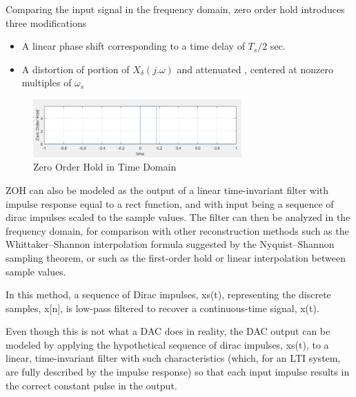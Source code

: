 \documentclass{article}
\begin{document}
Comparing the input signal in the frequency domain, zero order hold introduces three modifications
\begin{itemize}
    \item A linear phase shift corresponding to a time delay of $ T_s / 2 $ sec. 
    
    \item 
    A distortion of portion of $ X_\delta (j.\omega) $ and attenuated , centered at nonzero multiples of $ \omega_s $
\end{itemize}

\begin{figure}[htbp]
    \begin{center}
	\includegraphics[width=80mm]{figures/ZOH_small.PNG}
    \end{center}
    \caption{Zero Order Hold in Time Domain}
\end{figure}


\cite{b3} ZOH can also be modeled as the output of a linear time-invariant filter with impulse response equal to a rect function, and with input being a sequence of dirac impulses scaled to the sample values. The filter can then be analyzed in the frequency domain, for comparison with other reconstruction methods such as the Whittaker–Shannon interpolation formula suggested by the Nyquist–Shannon sampling theorem, or such as the first-order hold or linear interpolation between sample values.

In this method, a sequence of Dirac impulses, xs(t), representing the discrete samples, x[n], is low-pass filtered to recover a continuous-time signal, x(t).

Even though this is not what a DAC does in reality, the DAC output can be modeled by applying the hypothetical sequence of dirac impulses, xs(t), to a linear, time-invariant filter with such characteristics (which, for an LTI system, are fully described by the impulse response) so that each input impulse results in the correct constant pulse in the output.
\end{document}
